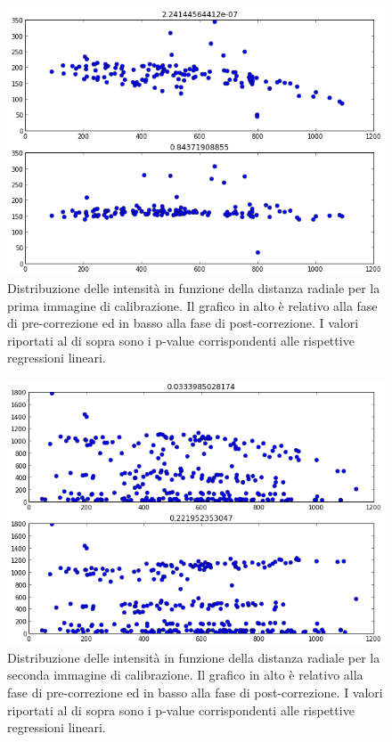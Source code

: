 \begin{figure}
 \centering
 \includegraphics[scale=.50]{img/CAP4pvalue1.png}
 \caption{\small{Distribuzione delle intensità in funzione della distanza radiale per la prima immagine di calibrazione. Il grafico in alto è relativo alla fase di pre-correzione ed in basso alla fase di post-correzione. I valori riportati al di sopra sono i p-value corrispondenti alle rispettive regressioni lineari.}}
 \label{fig:pvalue1}
\end{figure}

\begin{figure}
 \centering
 \includegraphics[scale=.50]{img/CAP4pvalue2.png}
 \caption{\small{Distribuzione delle intensità in funzione della distanza radiale per la seconda immagine di calibrazione. Il grafico in alto è relativo alla fase di pre-correzione ed in basso alla fase di post-correzione. I valori riportati al di sopra sono i p-value corrispondenti alle rispettive regressioni lineari.}}
 \label{fig:pvalue2}
\end{figure}

